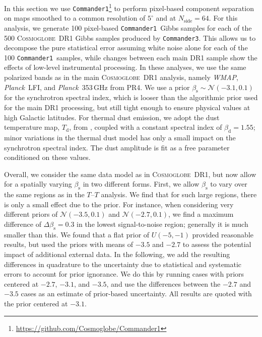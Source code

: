 \documentclass[twocolumn]{../../common/aa}
\def\WMAP{\emph{WMAP}}
\def\Planck{\emph{Planck}}
\def\commanderone{\texttt{Commander1}}
\def\commanderthree{\texttt{Commander3}}
\newcommand{\cosmoglobe}{\textsc{Cosmoglobe}}
\begin{document}
In this section we use \commanderone\footnote{\url{https://github.com/Cosmoglobe/Commander1}} to perform pixel-based component separation on maps smoothed to a common resolution of $5^\circ$ and at $N_\mathrm{side}=64$.
For this analysis, we generate 100 pixel-based \commanderone\ Gibbs samples for each of the 500 \cosmoglobe\ DR1 Gibbs samples produced by \commanderthree. This allows us to decompose the pure statistical error assuming white noise alone for each of the 100 \commanderone\ samples, while changes between each main DR1 sample show the effects of low-level instrumental processing. In these analyses, we use the same polarized bands as in the main \cosmoglobe\ DR1 analysis, namely \WMAP, \Planck\ LFI, and \Planck\ 353\,GHz from PR4. We use a prior $\beta_\mathrm s\sim\mathcal N(-3.1, 0.1)$ for the synchrotron spectral index, which is looser than the algorithmic prior used for the main DR1 processing, but still tight enough to ensure physical values at high Galactic latitudes. For thermal dust emission, we adopt the dust temperature map, $T_\mathrm d$, from \citet{planck2014-a12}, coupled with a constant spectral index of $\beta_\mathrm d=1.55$; minor variations in the thermal dust model has only a small impact on the synchrotron spectral index. The dust amplitude is fit as a free parameter conditioned on these values.

Overall, we consider the same data model as in \cosmoglobe\ DR1, but now allow for a spatially varying $\beta_\mathrm s$ in two different forms.
First, we allow $\beta_\mathrm s$ to vary over the same regions as in the $T$--$T$ analysis.
We find that for such large regions, there is only a small effect due to the prior. For instance, when considering very different priors of $\mathcal N(-3.5,0.1)$ and $\mathcal N(-2.7, 0.1)$, we find a maximum difference of $\Delta\beta_{\mathrm{s}}=0.3$ in the lowest signal-to-noise region; generally it is much smaller than this. 
We found that a flat prior of  $U(-5,-1)$ provided reasonable results, but used the priors with means of $-3.5$ and $-2.7$ to assess the potential impact of additional external data.
In the following, we add the resulting differences in quadrature to the uncertainty due to statistical and systematic errors to account for prior ignorance. We do this by running cases with priors centered at $-2.7$, $-3.1$, and $-3.5$, and use the differences between the $-2.7$ and $-3.5$ cases as an estimate of prior-based uncertainty. All results are quoted with the prior centered at $-3.1$.
\end{document}
